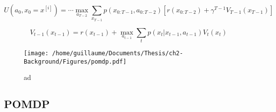 \begin{equation}
 U(a_0,x_0=x^{[i]}) =\cdots \max_{a_{T-2}} \sum\limits_{x_{T-1}} p(x_{0:T-1},a_{0:T-2})  \left[ r(x_{0:T-2}) + \gamma^{T-1} V_{T-1}(x_{T-1}) \right]
\end{equation}

\begin{equation}
 V_{t-1}(x_{t-1}) = r(x_{t-1}) + \max_{a_{t-1}} \sum\limits_{t} p(x_t|x_{t-1},a_{t-1}) V_{t}(x_t)
\end{equation}










\begin{figure}[h]
 \centering
 \texttt{[image: /home/guillaume/Documents/Thesis/ch2-Background/Figures/pomdp.pdf]}
  \caption{ad}
\end{figure}

\subsection{POMDP}


      
